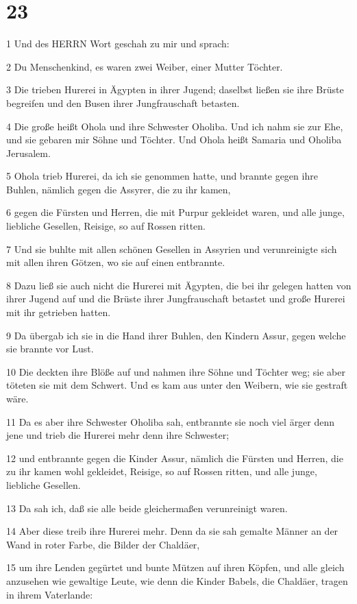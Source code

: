 \chapter{23}

\par 1 Und des HERRN Wort geschah zu mir und sprach:
\par 2 Du Menschenkind, es waren zwei Weiber, einer Mutter Töchter.
\par 3 Die trieben Hurerei in Ägypten in ihrer Jugend; daselbst ließen sie ihre Brüste begreifen und den Busen ihrer Jungfrauschaft betasten.
\par 4 Die große heißt Ohola und ihre Schwester Oholiba. Und ich nahm sie zur Ehe, und sie gebaren mir Söhne und Töchter. Und Ohola heißt Samaria und Oholiba Jerusalem.
\par 5 Ohola trieb Hurerei, da ich sie genommen hatte, und brannte gegen ihre Buhlen, nämlich gegen die Assyrer, die zu ihr kamen,
\par 6 gegen die Fürsten und Herren, die mit Purpur gekleidet waren, und alle junge, liebliche Gesellen, Reisige, so auf Rossen ritten.
\par 7 Und sie buhlte mit allen schönen Gesellen in Assyrien und verunreinigte sich mit allen ihren Götzen, wo sie auf einen entbrannte.
\par 8 Dazu ließ sie auch nicht die Hurerei mit Ägypten, die bei ihr gelegen hatten von ihrer Jugend auf und die Brüste ihrer Jungfrauschaft betastet und große Hurerei mit ihr getrieben hatten.
\par 9 Da übergab ich sie in die Hand ihrer Buhlen, den Kindern Assur, gegen welche sie brannte vor Lust.
\par 10 Die deckten ihre Blöße auf und nahmen ihre Söhne und Töchter weg; sie aber töteten sie mit dem Schwert. Und es kam aus unter den Weibern, wie sie gestraft wäre.
\par 11 Da es aber ihre Schwester Oholiba sah, entbrannte sie noch viel ärger denn jene und trieb die Hurerei mehr denn ihre Schwester;
\par 12 und entbrannte gegen die Kinder Assur, nämlich die Fürsten und Herren, die zu ihr kamen wohl gekleidet, Reisige, so auf Rossen ritten, und alle junge, liebliche Gesellen.
\par 13 Da sah ich, daß sie alle beide gleichermaßen verunreinigt waren.
\par 14 Aber diese treib ihre Hurerei mehr. Denn da sie sah gemalte Männer an der Wand in roter Farbe, die Bilder der Chaldäer,
\par 15 um ihre Lenden gegürtet und bunte Mützen auf ihren Köpfen, und alle gleich anzusehen wie gewaltige Leute, wie denn die Kinder Babels, die Chaldäer, tragen in ihrem Vaterlande:
